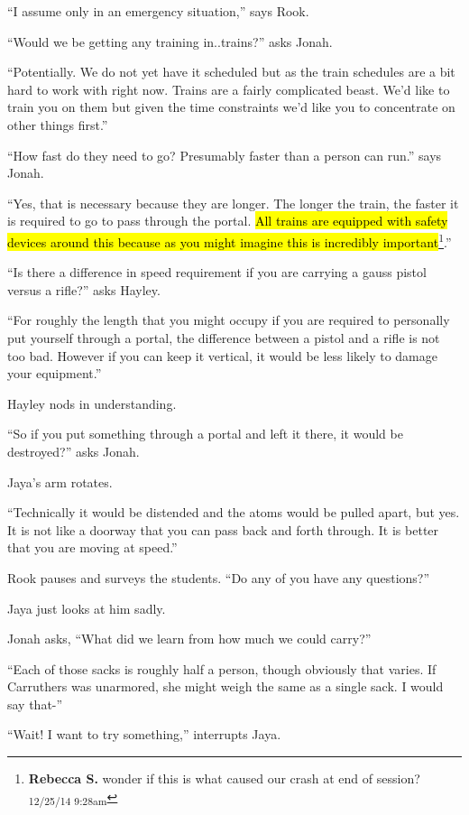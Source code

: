 ``I assume only in an emergency situation,'' says Rook.

``Would we be getting any training in..trains?'' asks Jonah.

``Potentially.  We do not yet have it scheduled but as the train schedules are a bit hard to work with right now.  Trains are a fairly complicated beast.  We'd like to train you on them but given the time constraints we'd like you to concentrate on other things first.''

``How fast do they need to go?  Presumably faster than a person can run.'' says Jonah.

``Yes, that is necessary because they are longer.  The longer the train, the faster it is required to go to pass through the portal.  \hl{All trains are equipped with safety devices around this because as you might imagine this is incredibly important}\footnote{\textbf{Rebecca S. }wonder if this is what caused our crash at end of session? \textsubscript{12/25/14 9:28am}}.''

``Is there a difference in speed requirement if you are carrying a gauss pistol versus a rifle?'' asks Hayley.

``For roughly the length that you might occupy if you are required to personally put yourself through a portal, the difference between a pistol and a rifle is not too bad.  However if you can keep it vertical, it would be less likely to damage your equipment.''

Hayley nods in understanding.

``So if you put something through a portal and left it there, it would be destroyed?'' asks Jonah.

Jaya's arm rotates.

``Technically it would be distended and the atoms would be pulled apart, but yes.  It is not like a doorway that you can pass back and forth through.  It is better that you are moving at speed.''

Rook pauses and surveys the students.  ``Do any of you have any questions?''

Jaya just looks at him sadly.

Jonah asks, ``What did we learn from how much we could carry?''

``Each of those sacks is roughly half a person, though obviously that varies.  If Carruthers was unarmored, she might weigh the same as a single sack.  I would say that-''

``Wait!  I want to try something,'' interrupts Jaya.  



